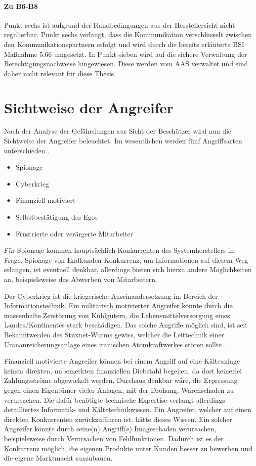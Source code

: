 \documentclass[11pt,a4paper]{report}
\begin{document}
\paragraph{Zu B6-B8} Punkt sechs ist aufgrund der Randbedingungen aus der Herstellersicht nicht regulierbar. Punkt sechs verlangt, dass die Kommunikation verschlüsselt zwischen den Kommunikationspartnern erfolgt und wird durch die bereits erläuterte BSI Maßnahme 5.66 umgesetzt. In Punkt sieben wird auf die sichere Verwaltung der Berechtigungsnachweise hingewiesen. Diese werden vom AAS verwaltet und sind daher nicht relevant für diese Thesis.

\section{Sichtweise der Angreifer} \label{sec:attackers}

Nach der Analyse der Gefährdungen aus Sicht der Beschützer wird nun die Sichtweise der Angreifer beleuchtet. Im wesentlichen werden fünf Angriffsarten unterschieden \cite[s.~256]{gutmann}\cite{emp_sabo}\cite{wiki_cyberwar}.

\begin{itemize}[leftmargin=*]
\item Spionage
\item Cyberkrieg
\item Finanziell motiviert
\item Selbstbestätigung des Egos
\item Frustrierte oder verärgerte Mitarbeiter
\end{itemize}

Für Spionage kommen hauptsächlich Konkurrenten des Systemherstellers in Frage. Spionage von Endkunden-Konkurrenz, um Informationen auf diesem Weg erlangen, ist eventuell denkbar, allerdings bieten sich hierzu andere Möglichkeiten an, beispielsweise das Abwerben von Mitarbeitern. 

Der Cyberkrieg ist die kriegerische Auseinandersetzung im Bereich der Informationstechnik. Ein militärisch motivierter Angreifer könnte durch die massenhafte Zerstörung von Kühlgütern, die Lebensmittelversorgung eines Landes/Kontinentes stark beschädigen. Das solche Angriffe möglich sind, ist seit Bekanntwerden des Stuxnet-Wurms gewiss, welcher die Leittechnik einer Urananreicherungsanlage eines iranischen Atomkraftwerkes stören sollte \cite{wiki_stuxnet}.

Finanziell motivierte Angreifer können bei einem Angriff auf eine Kälteanlage keinen direkten, unbemerkten finanziellen Diebstahl begehen, da dort keinerlei Zahlungsströme abgewickelt werden. Durchaus denkbar wäre, die Erpressung gegen einen Eigentümer vieler Anlagen, mit der Drohung, Warenschaden zu verursachen. Die dafür benötigte technische Expertise verlangt allerdings detailliertes Informatik- und Kältetechnikwissen. Ein Angreifer, welcher auf einen direkten Konkurrenten zurückzuführen ist, hätte dieses Wissen. Ein solcher Angreifer könnte durch seine(n) Angriff(e) Imageschaden verursachen, beispielsweise durch Verursachen von Fehlfunktionen. Dadurch ist es der Konkurrenz möglich, die eigenen Produkte unter Kunden besser zu bewerben und die eigene Marktmacht auszubauen. 
\end{document}
